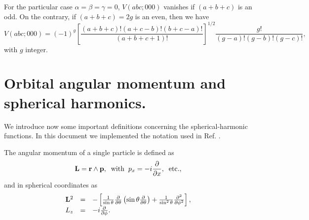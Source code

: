 \documentclass[]{interact}
\begin{document}
\vspace{0.4cm}


For the particular case $\alpha=\beta=\gamma=0$, $V(abc;000)$ vanishes if $(a+b+c)$ is an odd. On the contrary, if $(a+b+c)=2g$ is an even, then we have
\begin{equation}
  V(abc;000)=(-1)^g\left[\frac{(a+b+c)!(a+c-b)!(b+c-a)!}{(a+b+c+1)!}\right]^{1/2}\frac{g!}{(g-a)!(g-b)!(g-c)!},
\end{equation}
with $g$ integer. 

\section{Orbital angular momentum and spherical harmonics.}

We introduce now some important definitions concerning the spherical-harmonic functions. In this document we implemented the notation used in Ref. \cite{Condon}. 

The angular momentum of a single particle is defined as
\begin{equation}
 {\bf L= r \wedge p },\;\;\mathrm{with}\;\;p_x=-i\frac{\partial}{\partial x},\;\;\mathrm{etc.}, 
\end{equation}
and in spherical coordinates as
\begin{equation}
 \begin{array}{rcl}
  {\bf L}^2&=&-\left[\frac{1}{\sin\theta}\frac{\partial}{\partial\theta}\left(\sin\theta\frac{\partial}{\partial\theta}\right)+\frac{1}{\sin^2\theta}\frac{\partial^2}{\partial\phi^2}\right],\\
  L_z&=&-i\frac{\partial}{\partial\phi}.
 \end{array}
\end{equation}
\end{document}
